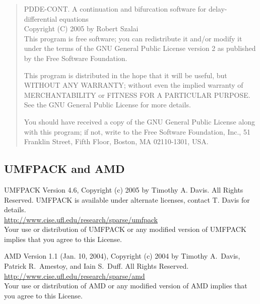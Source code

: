 \documentclass[10pt,a4paper]{ddedoc}
\begin{document}
\begin{quote}
PDDE-CONT. A continuation and bifurcation software for delay-differential
equations \\
Copyright (C) 2005 by Robert Szalai \\

This program is free software; you can redistribute it and/or modify
it under the terms of the GNU General Public License version 2 as published by
the Free Software Foundation.

This program is distributed in the hope that it will be useful,
but WITHOUT ANY WARRANTY; without even the implied warranty of
MERCHANTABILITY or FITNESS FOR A PARTICULAR PURPOSE.  See the
GNU General Public License for more details.

You should have received a copy of the GNU General Public License
along with this program; if not, write to the Free Software
Foundation, Inc., 51 Franklin Street, Fifth Floor, Boston, MA  02110-1301, USA.
\end{quote}

\subsection{UMFPACK and AMD}

\noindent
UMFPACK Version 4.6, Copyright (c) 2005 by Timothy A. Davis.
All Rights Reserved.
UMFPACK is available under alternate licenses, contact T. Davis for details.\\
\url{http://www.cise.ufl.edu/research/sparse/umfpack}\\
Your use or distribution of UMFPACK or any modified version of
UMFPACK implies that you agree to this License.

\noindent
AMD Version 1.1 (Jan. 10, 2004),
Copyright (c) 2004 by Timothy A.~Davis, Patrick R.~Amestoy, and Iain S.~Duff.
All Rights Reserved.\\
\url{http://www.cise.ufl.edu/research/sparse/amd}\\
Your use or distribution of AMD or any modified version of
AMD implies that you agree to this License.
\end{document}

